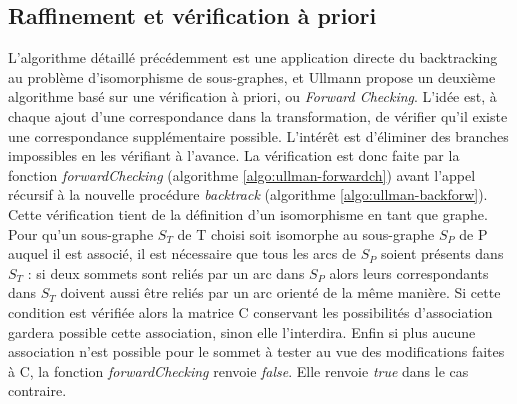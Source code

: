\subsection{Raffinement et vérification à priori}
L'algorithme détaillé précédemment est une application directe du backtracking au problème d'isomorphisme de sous-graphes, et Ullmann propose un deuxième algorithme basé sur une vérification à priori, ou \emph{Forward Checking}. L'idée est, à chaque ajout d'une correspondance dans la transformation,
de vérifier qu'il existe une correspondance supplémentaire possible. L'intérêt est d'éliminer des branches impossibles en les vérifiant à l'avance. La vérification est donc faite par la fonction \emph{forwardChecking} (algorithme \ref{algo:ullman-forwardch}) avant l'appel récursif à la nouvelle procédure \emph{backtrack} (algorithme \ref{algo:ullman-backforw}). 
Cette vérification tient de la définition d'un isomorphisme en tant que graphe.
Pour qu'un sous-graphe $S_T$ de T choisi soit isomorphe au sous-graphe $S_P$ de P auquel il est associé, il est nécessaire que tous les arcs de $S_P$ soient présents dans $S_T$ : si deux sommets sont reliés par un arc dans $S_P$ alors leurs correspondants
dans $S_T$ doivent aussi être reliés par un arc orienté de la même manière. Si cette condition est vérifiée alors la matrice C conservant les possibilités d'association gardera
possible cette association, sinon elle l'interdira. Enfin si plus aucune association n'est possible pour le sommet à tester au vue des modifications faites à C, la fonction
\emph{forwardChecking} renvoie \emph{false}. Elle renvoie \emph{true} dans le cas contraire. 



